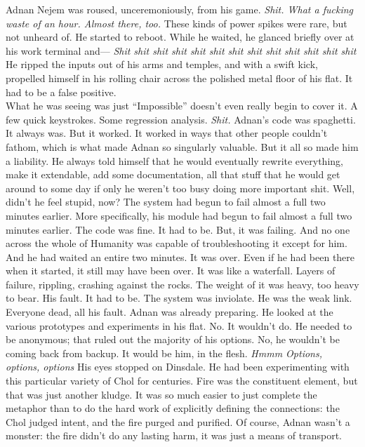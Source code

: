 Adnan Nejem was roused, unceremoniously, from his game.
\SmallVSpace
\emph{Shit. What a fucking waste of an hour. Almost there, too.}
\SmallVSpace
These kinds of power spikes were rare, but not unheard of. He started to reboot. While he waited, he glanced briefly over at his work terminal and\mbox{---}
\SmallVSpace
\emph{Shit shit shit shit shit shit shit shit shit shit shit shit shit}
\SmallVSpace
He ripped the inputs out of his arms and temples, and with a swift kick, propelled himself in his rolling chair across the polished metal floor of his flat. It had to be a false positive.\\What he was seeing was just{\el} “Impossible” doesn’t even really begin to cover it.
\SmallVSpace
A few quick keystrokes. Some regression analysis.
\SmallVSpace
\emph{Shit.}
\SmallVSpace
Adnan’s code was spaghetti. It always was. But it worked. It worked in ways that other people couldn’t fathom, which is what made Adnan so singularly valuable. But it all so made him a liability. He always told himself that he would eventually rewrite everything, make it extendable, add some documentation, all that stuff that he would get around to some day if only he weren’t too busy doing more important shit.
\SmallVSpace
Well, didn’t he feel stupid, now?
\SmallVSpace
The system had begun to fail almost a full two minutes earlier. More specifically, his module had begun to fail almost a full two minutes earlier. The code was fine. It had to be. But, it was failing. And no one across the whole of Humanity was capable of troubleshooting it except for him. And he had waited an entire two minutes. It was over. Even if he had been there when it started, it still may have been over.
\SmallVSpace
It was like a waterfall. Layers of failure, rippling, crashing against the rocks. The weight of it was heavy, too heavy to bear. His fault. It had to be. The system was inviolate. He was the weak link. Everyone dead, all his fault.
\SmallVSpace
Adnan was already preparing. He looked at the various prototypes and experiments in his flat. No. It wouldn’t do. He needed to be anonymous; that ruled out the majority of his options. No, he wouldn’t be coming back from backup. It would be him, in the flesh.
\SomeVSpace
\emph{Hmmm{\el} Options, options, options{\el}}
\SomeVSpace
His eyes stopped on Dinsdale. He had been experimenting with this particular variety of Chol for centuries. Fire was the constituent element, but that was just another kludge. It was so much easier to just complete the metaphor than to do the hard work of explicitly defining the connections: the Chol judged intent, and the fire purged and purified. Of course, Adnan wasn’t a monster: the fire didn’t do any lasting harm, it was just a means of transport.
